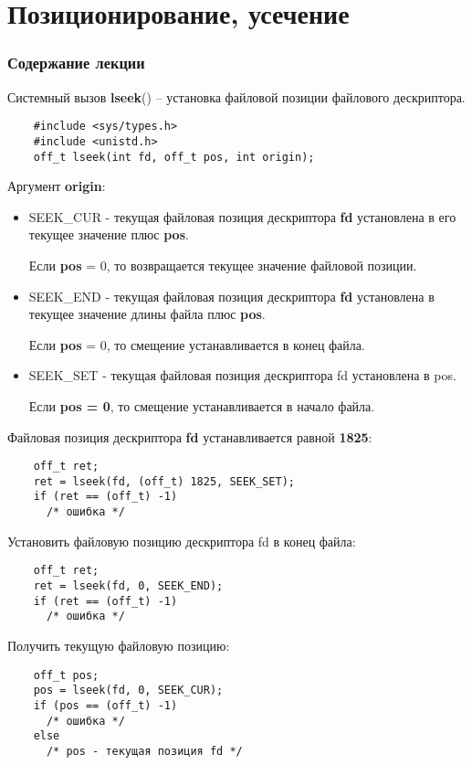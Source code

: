 \documentclass[xcolor=table]{beamer}
\begin{document}
\section{Позиционирование, усечение}
\begin{frame}
  \frametitle{Содержание лекции}
  \tableofcontents[current]
\end{frame}

\begin{frame}[fragile]
	Системный вызов \textbf{lseek}()  -- установка файловой позиции файлового дескриптора. 

	\begin{verbatim}
	#include <sys/types.h>
	#include <unistd.h>
	off_t lseek(int fd, off_t pos, int origin);
	\end{verbatim}

	Аргумент \textbf{origin}:
	\begin{itemize}
		\item SEEK\_CUR - текущая файловая позиция дескриптора \textbf{fd} установлена в его текущее значение плюс \textbf{pos}. 
		
		Если \textbf{pos} = 0, то возвращается текущее значение файловой позиции.
		\item SEEK\_END - текущая файловая позиция дескриптора \textbf{fd} установлена в текущее значение длины файла плюс \textbf{pos}.
		
		Если \textbf{pos} = 0, то смещение устанавливается в конец файла.
		\item SEEK\_SET - текущая файловая позиция дескриптора fd установлена в pos. 
		
		Если \textbf{pos = 0}, то смещение устанавливается в начало файла. 		
	\end{itemize}
\end{frame}

\begin{frame}[fragile]
	Файловая позиция дескриптора \textbf{fd} устанавливается равной \textbf{1825}:

	\begin{verbatim}
	off_t ret;	
	ret = lseek(fd, (off_t) 1825, SEEK_SET);	
	if (ret == (off_t) -1)
	  /* ошибка */ 
	\end{verbatim}
	
	Установить файловую позицию дескриптора fd в конец файла:
	
	\begin{verbatim}
	off_t ret;	
	ret = lseek(fd, 0, SEEK_END);	
	if (ret == (off_t) -1)
	  /* ошибка */ 
	\end{verbatim}
	
	Получить текущую файловую позицию:

	\begin{verbatim}
	off_t pos;	
	pos = lseek(fd, 0, SEEK_CUR);	
	if (pos == (off_t) -1)
	  /* ошибка */ 
	else
	  /* pos - текущая позиция fd */
	\end{verbatim}
\end{frame}
\end{document}
